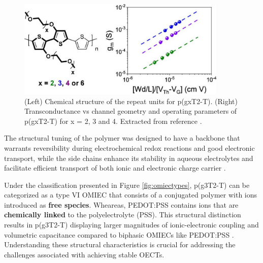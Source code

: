 \begin{figure}[h]
	\centering
	\includegraphics[width=10cm]{Images/pdf/pg3t+perf.pdf}
	\caption[Chemical structure and transconductance of g2T-T with side-chain engineering]{(Left) Chemical structure of the repeat units for p(gxT2-T). (Right) Transconductance vs channel geometry and operating parameters of p(gxT2-T) for x = 2, 3 and 4. Extracted from reference \cite{moserEthyleneGlycolBasedSide2020}.}
	\label{fig:pg3t}
\end{figure}

The structural tuning of the polymer was designed to have a backbone that warrants reversibility during electrochemical redox reactions and good electronic transport, while the side chains enhance its stability in aqueous electrolytes and facilitate efficient transport of both ionic and electronic charge carrier \cite{moiaDesignEvaluationConjugated2019}. 



Under the classification presented in Figure \ref{fig:omiectypes}, p(g3T2-T) can be categorized as a type VI OMIEC that consists of a conjugated polymer with ions introduced as \textbf{free species}. Wheareas, PEDOT:PSS contains ions that are \textbf{chemically linked} to the polyelectrolyte (PSS). This structural distinction results in p(g3T2-T) displaying larger magnitudes of ionic-electronic coupling and volumetric capacitance compared to biphasic OMIECs like PEDOT:PSS \cite{paulsenOrganicMixedIonic2020}. Understanding these structural characteristics is crucial for addressing the challenges associated with achieving stable OECTs.%

